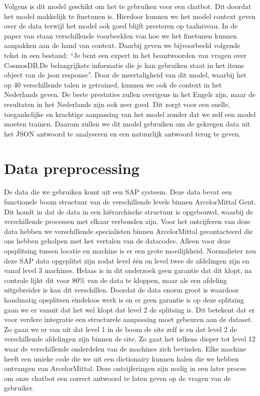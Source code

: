 Volgens \textcite{microsoft2024phi4} is dit model geschikt om het te gebruiken voor een chatbot. Dit doordat het model makkelijk te finetunen is.
Hierdoor kunnen we het model context geven over de data terwijl het model ook goed blijft presteren op taalniveau.
In de paper van \textcite{microsoft2024phi4} staan verschillende voorbeelden van hoe we het finetunen kunnen aanpakken aan de hand van context.
Daarbij geven we bijvoorbeeld volgende tekst in een bestand: ``Je bent een expert in het beantwoorden van vragen over CosmosDB.\@ De belangrijkste informatie die je kan gebruiken staat in het items object van de json response''.
Door de meertaligheid van dit model, waarbij het op 40 verschillende talen is getrained, kunnen we ook de context in het Nederlands geven.
De beste prestaties zullen overigens in het Engels zijn, maar de resultaten in het Nederlands zijn ook zeer goed.
Dit zorgt voor een snelle, toegankelijke en krachtige aanpassing van het model zonder dat we zelf een model moeten trainen.
Daarom zullen we dit model gebruiken om de gekregen data uit het JSON antwoord te analyseren en een natuurlijk antwoord terug te geven.

\section{Data preprocessing}
De data die we gebruiken komt uit een SAP systeem. Deze data bevat een functionele boom structuur van de verschillende levels binnen ArcelorMittal Gent.
Dit houdt in dat de data in een hiërarchische structuur is opgebouwd, waarbij de verschillende processen met elkaar verbonden zijn.
Voor het ontcijferen van deze data hebben we verschillende specialisten binnen ArcelorMittal gecontacteerd die ons hebben geholpen met het vertalen van de datacodes.
Alleen voor deze opsplitsing tussen locatie en machine is er een grote moeilijkheid. Normalieter zou deze SAP data opgeplitst zijn zodat level één en level twee de afdelingen zijn en vanaf level 3 machines. 
Helaas is in dit onderzoek geen garantie dat dit klopt, na controle lijkt dit voor 80\% van de data te kloppen, maar als een afdeling uitgebreider is kan dit verschillen.
Doordat de data enorm groot is waardoor handmatig opsplitsen eindeloos werk is en er geen garantie is op deze splitsing gaan we er vanuit dat het wel klopt dat level 2 de splitsing is. 
Dit betekent dat er voor verdere integratie een structurele aanpassing moet gebeuren aan de dataset.
Zo gaan we er van uit dat level 1 in de boom de site zelf is en dat level 2 de verschillende afdelingen zijn binnen de site. Zo gaat het telkens dieper tot level 12 waar de verschillende onderdelen van de machines zich bevinden.
Elke machine heeft een unieke code die we uit een dictionairy kunnen halen die we hebben ontvangen van ArcelorMittal.
Deze ontcijferingen zijn nodig in een later proces om onze chatbot een correct antwoord te laten geven op de vragen van de gebruiker.

